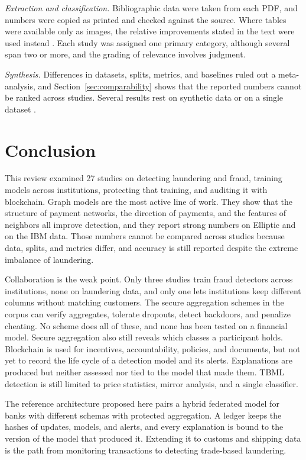 \documentclass[journal]{IEEEtran}
\begin{document}
\emph{Extraction and classification.} Bibliographic data were taken from each PDF, and numbers were copied as printed and checked against the source. Where tables were available only as images, the relative improvements stated in the text were used instead \cite{luo2024mlad}. Each study was assigned one primary category, although several span two or more, and the grading of relevance involves judgment.

\emph{Synthesis.} Differences in datasets, splits, metrics, and baselines ruled out a meta-analysis, and Section~\ref{sec:comparability} shows that the reported numbers cannot be ranked across studies. Several results rest on synthetic data \cite{amber2026cbdc,mao2026pmegnn} or on a single dataset \cite{luo2024mlad}.

\section{Conclusion}
\label{sec:conclusion}

This review examined 27 studies on detecting laundering and fraud, training models across institutions, protecting that training, and auditing it with blockchain. Graph models are the most active line of work. They show that the structure of payment networks, the direction of payments, and the features of neighbors all improve detection, and they report strong numbers on Elliptic and on the IBM data. Those numbers cannot be compared across studies because data, splits, and metrics differ, and accuracy is still reported despite the extreme imbalance of laundering.

Collaboration is the weak point. Only three studies train fraud detectors across institutions, none on laundering data, and only one lets institutions keep different columns without matching customers. The secure aggregation schemes in the corpus can verify aggregates, tolerate dropouts, detect backdoors, and penalize cheating. No scheme does all of these, and none has been tested on a financial model. Secure aggregation also still reveals which classes a participant holds. Blockchain is used for incentives, accountability, policies, and documents, but not yet to record the life cycle of a detection model and its alerts. Explanations are produced but neither assessed nor tied to the model that made them. TBML detection is still limited to price statistics, mirror analysis, and a single classifier.

The reference architecture proposed here pairs a hybrid federated model for banks with different schemas with protected aggregation. A ledger keeps the hashes of updates, models, and alerts, and every explanation is bound to the version of the model that produced it. Extending it to customs and shipping data is the path from monitoring transactions to detecting trade-based laundering.
\end{document}
